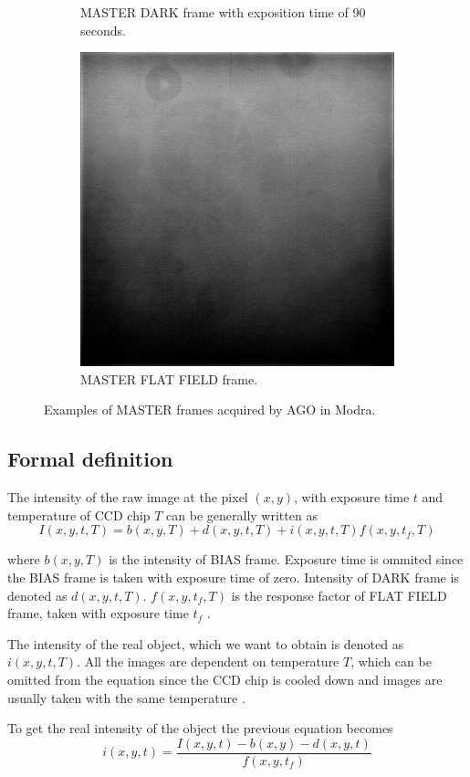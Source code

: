 \begin{figure}[!h]
\begin{subfigure}[t]{.3\textwidth}
            \caption{MASTER DARK frame with exposition time of 90 seconds.}
            \label{fig:darkframe}
        \end{subfigure}
        \hfill
        \begin{subfigure}[t]{.3\textwidth}
            \centering
            \includegraphics[width=\textwidth]{images/flatframe.jpg}
            \caption{MASTER FLAT FIELD frame.}
            \label{fig:flatframe}
        \end{subfigure}
        \hfill
        \caption{Examples of MASTER frames acquired by AGO in Modra.}
        \label{fig:masterframes}
    \end{figure}



\subsection{Formal definition}

The intensity of the raw image at the pixel $(x,y)$, with exposure time $t$ and temperature of CCD chip $T$ can be generally written as
\[ I(x,y,t,T) = b(x,y,T) + d(x,y,t,T) + i(x,y,t,T) f(x,y,t_f,T) \]

where $b(x,y,T)$ is the intensity of BIAS frame. Exposure time is ommited since the BIAS frame is taken with exposure time of zero. Intensity of DARK frame is denoted as $d(x,y,t,T)$. $f(x,y,t_f,T)$ is the response factor of FLAT FIELD frame, taken with exposure time $t_f$ \cite{articleParimucha}.

The intensity of the real object, which we want to obtain is denoted as $i(x,y,t,T)$. 
All the images are dependent on temperature $T$, which can be omitted from the equation since the CCD chip is cooled down and images are usually taken with the same temperature \cite{articleParimucha}.

To get the real intensity of the object the previous equation becomes
\[
i(x,y,t) = \frac{ I(x,y,t) - b(x,y) - d(x,y,t)}{f(x,y,t_f)}
\]

